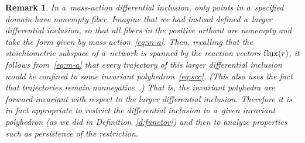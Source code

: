 \documentclass[pdftex]{sigma}
\newtheorem{Remark}[Theorem]{Remark}
\newcommand{\flux}[1]{\operatorname{f\/lux}(#1)} %
\begin{document}
\begin{Remark}
\label{rmk:remain_in_scc}
In a~mass-action dif\/ferential inclusion, only points in a~specif\/ied domain have nonempty f\/iber.
Imagine that we had instead def\/ined a~larger dif\/ferential inclusion, so that all f\/ibers in the positive orthant
are nonempty and take the form given by mass-action~\eqref{eq:m-a}.
Then, recalling that the stoichiometric subspace of a~network is spanned by the reaction vectors $\flux{r}$, it
follows from~\eqref{eq:m-a} that every trajectory of this larger dif\/ferential inclusion would be conf\/ined to some
invariant polyhedron~\eqref{eq:scc}.
(This also uses the fact that trajectories remain nonnegative~\cite[\S~2]{ADS11}.) That is, the invariant polyhedra are
forward-invariant with respect to the larger dif\/ferential inclusion.
Therefore it is in fact appropriate to restrict the dif\/ferential inclusion to a~given invariant polyhedron (as we did
in Def\/inition~\ref{d:functor}) and then to analyze properties such as persistence of the restriction.
\end{Remark}
\end{document}
